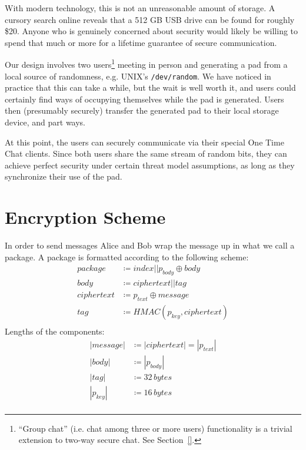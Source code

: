 \documentclass[twocolumn]{article}
\begin{document}
With modern technology, this is not an unreasonable amount of storage. A cursory search online reveals that a 512 GB USB drive can be found for roughly \$20. Anyone who is genuinely concerned about security would likely be willing to spend that much or more for a lifetime guarantee of secure communication.

Our design involves two users\footnote{
``Group chat'' (i.e. chat among three or more users) functionality is a trivial extension to two-way secure chat. See Section~\ref{}. %
}
meeting in person and generating a pad from a local source of randomness, e.g. UNIX's \texttt{/dev/random}. We have noticed in practice that this can take a while, but the wait is well worth it, and users could certainly find ways of occupying themselves while the pad is generated. Users then (presumably securely) transfer the generated pad to their local storage device, and part ways.

At this point, the users can securely communicate via their special One Time Chat clients. Since both users share the same stream of random bits, they can achieve perfect security under certain threat model assumptions, as long as they synchronize their use of the pad.

\section{Encryption Scheme}
\label{sec:encryption}

In order to send messages Alice and Bob wrap the message up in what we call a package. A package is formatted according to the following scheme:
\begin{align*}
package &\coloneqq index || p_{body} \oplus body \\
body &\coloneqq ciphertext || tag \\
ciphertext &\coloneqq p_{text} \oplus message \\
tag &\coloneqq HMAC(p_{key},ciphertext) \\
\end{align*}
Lengths of the components:
\begin{align*}
|message| &\coloneqq |ciphertext|=|p_{text}|\\
|body| &\coloneqq |p_{body}| \\
|tag| &\coloneqq 32\, bytes \\
|p_{key}| &\coloneqq 16\, bytes \\
\end{align*}
\end{document}
